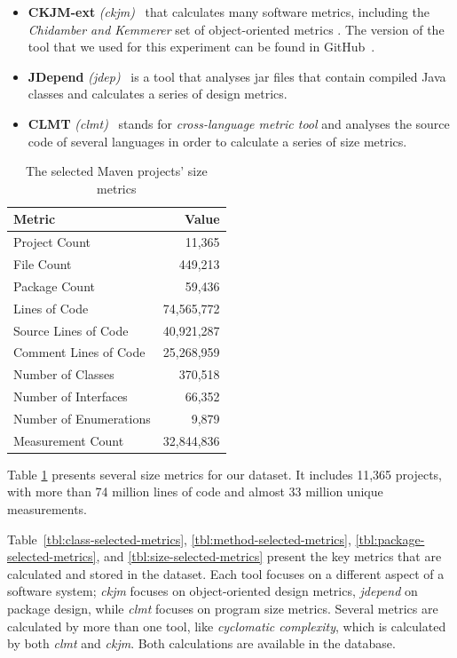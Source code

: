 \documentclass{sig-alternate}
\begin{document}
\begin{itemize}
  \item \textbf{CKJM-ext} \textit{(ckjm)}~\cite{Spi05g} that calculates many software metrics, including the \textit{Chidamber and Kemmerer} set of object-oriented metrics \cite{CHKE94}. The version of the tool that we used for this experiment can be found in GitHub~\cite{CKJM}.

  \item \textbf{JDepend} \textit{(jdep)}~\cite{JDEPEND} is a tool that analyses {\sc jar} files that contain compiled Java classes and calculates a series of design metrics.

  \item \textbf{CLMT} \textit{(clmt)}~\cite{SGKL09} stands for \textit{cross-language metric tool} and analyses the source code of several languages in order to calculate a series of size metrics.
\end{itemize}

\begin{table}
\centering
\caption{The selected Maven projects' size metrics}
\label{tbl:oss-size-metrics}
\begin{tabular}{l r}
 \hline
\textbf{Metric} & \textbf{Value}\\
\hline
Project Count & 11,365\\
File Count & 449,213\\
Package Count & 59,436\\
Lines of Code & 74,565,772\\
Source Lines of Code & 40,921,287\\
Comment Lines of Code & 25,268,959\\
Number of Classes & 370,518\\
Number of Interfaces & 66,352\\
Number of Enumerations & 9,879\\
Measurement Count & 32,844,836\\
\hline
\end{tabular}
\end{table}

Table \ref{tbl:oss-size-metrics} presents several size metrics for our dataset. It includes 11,365 projects, with more than 74 million lines of code and almost 33 million unique measurements.

Table~\ref{tbl:class-selected-metrics}, \ref{tbl:method-selected-metrics}, \ref{tbl:package-selected-metrics}, and \ref{tbl:size-selected-metrics} present the key metrics that are calculated and stored in the dataset. Each tool focuses on a different aspect of a software system; \textit{ckjm} focuses on object-oriented design metrics, \textit{jdepend} on package design, while \textit{clmt} focuses on program size metrics. Several metrics are calculated by more than one tool, like \textit{cyclomatic complexity}, which is calculated by both \textit{clmt} and \textit{ckjm}. Both calculations are available in the database.
\end{document}
